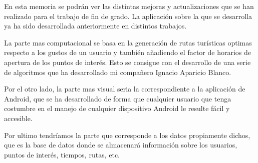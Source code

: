 
En esta memoria se podrán ver las distintas mejoras y actualizaciones que se han realizado para el trabajo de fin de grado. La aplicación sobre la que se desarrolla ya ha sido desarrollada anteriormente en distintos trabajos. 

La parte mas computacional se basa en la generación de rutas turísticas optimas respecto a los gustos de un usuario y también añadiendo el factor de horarios de apertura de los puntos de interés. Esto se consigue con el desarrollo de una serie de algoritmos que ha desarrollado mi compañero Ignacio Aparicio Blanco.

Por el otro lado, la parte mas visual seria la correspondiente a la aplicación de Android, que se ha desarrollado de forma que cualquier usuario que tenga costumbre en el manejo de cualquier dispositivo Android le resulte fácil y accesible.

Por ultimo tendríamos la parte que corresponde a los datos propiamente dichos, que es la base de datos donde se almacenará información sobre los usuarios, puntos de interés, tiempos, rutas, etc.

